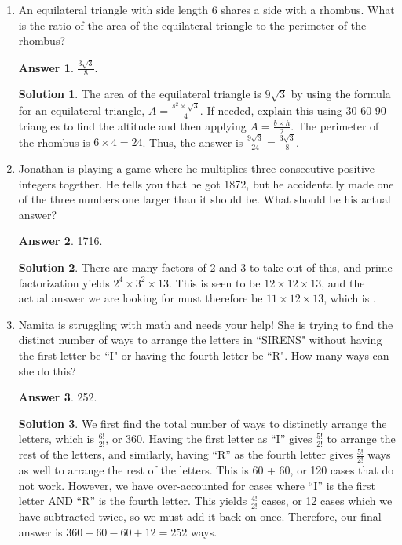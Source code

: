\documentclass[11pt]{article}
\theoremstyle{definition}
\newtheorem*{solution}{Solution}
\newtheorem*{answer}{Answer}
\begin{document}
\begin{enumerate}
\item An equilateral triangle with side length 6 shares a side with a rhombus. What is the ratio of the area of the equilateral triangle to the perimeter of the rhombus?

\begin{answer}
$\frac{3\sqrt{3}}{8}$.
\end{answer}
\begin{solution}
The area of the equilateral triangle is $9\sqrt{3}$ by using the formula for an equilateral triangle, $A = \frac{s^{2}\times\sqrt{3}}{4}$. If needed, explain this using 30-60-90 triangles to find the altitude and then applying $A = \frac{b\times h}{2}$. The perimeter of the rhombus is $6\times4 = 24$. Thus, the answer is $\frac{9\sqrt{3}}{24} = \boxed{\frac{3\sqrt{3}}{8}}$.
\end{solution}

\item Jonathan is playing a game where he multiplies three consecutive positive integers together. He tells you that he got 1872, but he accidentally made one of the three numbers one larger than it should be. What should be his actual answer?

\begin{answer}
1716.
\end{answer}
\begin{solution}
There are many factors of 2 and 3 to take out of this, and prime factorization yields $2^{4}\times 3^{2} \times 13$. This is seen to be $12\times 12 \times 13$, and the actual answer we are looking for must therefore be $11\times 12 \times 13$, which is .
\end{solution}

\item Namita is struggling with math and needs your help! She is trying to find the distinct number of ways to arrange the letters in ``SIRENS" without having the first letter be ``I" or having the fourth letter be ``R". How many ways can she do this?

\begin{answer}
252.
\end{answer}
\begin{solution}
We first find the total number of ways to distinctly arrange the letters, which is $\frac{6!}{2!}$, or 360. Having the first letter as "`I"' gives $\frac{5!}{2!}$ to arrange the rest of the letters, and similarly, having "`R"' as the fourth letter gives $\frac{5!}{2!}$ ways as well to arrange the rest of the letters. This is 60 + 60, or 120 cases that do not work. However, we have over-accounted for cases where "`I"' is the first letter AND "`R"' is the fourth letter. This yields $\frac{4!}{2!}$ cases, or 12 cases which we have subtracted twice, so we must add it back on once. Therefore, our final answer is $360-60-60+12 = \boxed{252}$ ways.
\end{solution}


\end{enumerate}
\end{document}
